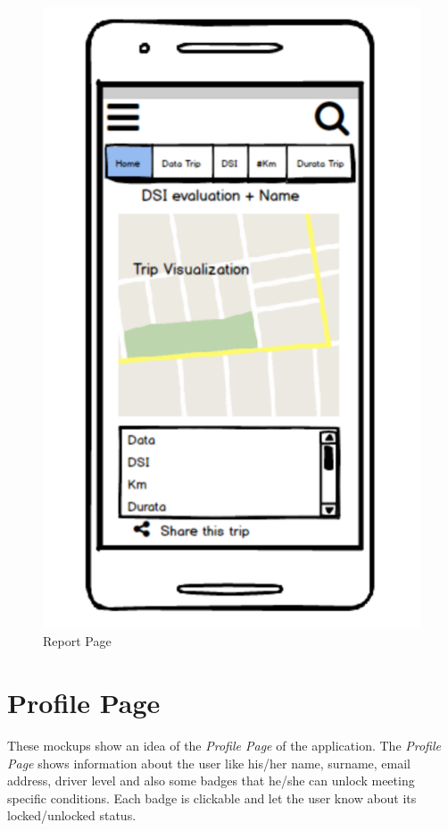 \begin{figure}[htbp]
	\centering
	\begin{minipage}[b]{0.6\textwidth}
		\includegraphics[width=\textwidth]{cpt/img/ReportPage.png}
		\caption{Report Page}
	\end{minipage}	
\end{figure}

\clearpage
\section{Profile Page}
These mockups show an idea of the \textit{Profile Page} of the application. The \textit{Profile Page} shows information about the user like his/her name, surname, email address, driver level and also some badges that he/she can unlock meeting specific conditions. Each badge is clickable and let the user know about its locked/unlocked status.\\

